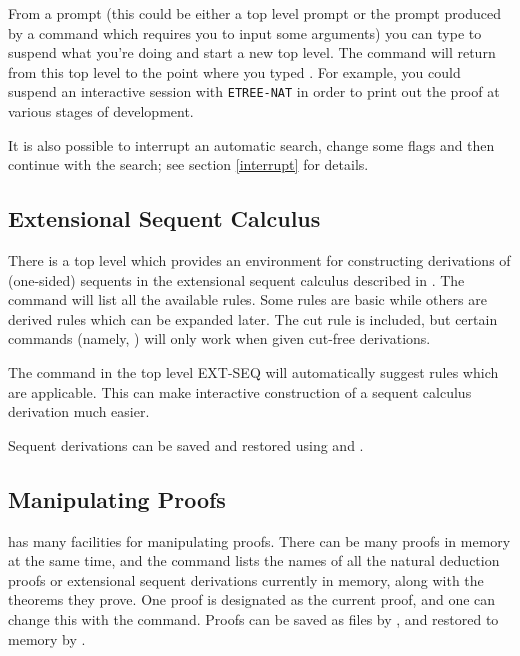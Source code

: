 From a {\TPS} prompt (this could be either a top level prompt or the prompt produced by a
command which requires you to input some arguments) you can type  to suspend
what you're doing and start a new top level. The command  will return from this
top level to the point where you typed . For example, you could suspend
an interactive session with {\tt ETREE-NAT} in order to print out the proof at various stages of
development.

It is also possible to interrupt an automatic search, change some flags and then continue with the
search; see section \ref{interrupt} for details.

\subsection{Extensional Sequent Calculus}

There is a top level  which provides
an environment for constructing derivations of (one-sided) sequents
in the extensional sequent calculus described in \cite{Brown2004a}.
The command  will list all the available rules.
Some rules are basic while others are derived rules which can be
expanded later.  The cut rule is included, but certain commands
(namely, ) will only work when given
cut-free derivations.

The command  in the top level EXT-SEQ will
automatically suggest rules which are applicable.  This can
make interactive construction of a sequent calculus derivation
much easier.

Sequent derivations can be saved and restored using 
and .

\subsection{Manipulating Proofs}\label{manip-pfs}

{\TPS} has many facilities for manipulating proofs.  There can be many
proofs in memory at the same time, and the command  lists the
names of all the natural deduction proofs or extensional sequent
derivations currently in memory, along with the theorems they
prove. One proof is designated as the current proof, and one can
change this with the  command.  Proofs can be saved as files
by , and restored to memory by .

